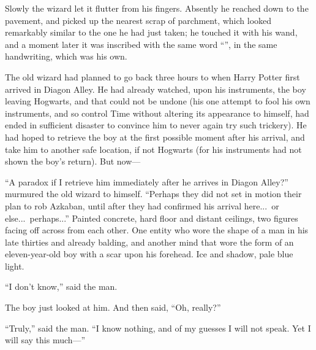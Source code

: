 Slowly the wizard let it flutter from his fingers. Absently he reached down to the pavement, and picked up the nearest scrap of parchment, which looked remarkably similar to the one he had just taken; he touched it with his wand, and a moment later it was inscribed with the same word “”, in the same handwriting, which was his own.

The old wizard had planned to go back three hours to when Harry Potter first arrived in Diagon Alley. He had already watched, upon his instruments, the boy leaving Hogwarts, and that could not be undone (his one attempt to fool his own instruments, and so control Time without altering its appearance to himself, had ended in sufficient disaster to convince him to never again try such trickery). He had hoped to retrieve the boy at the first possible moment after his arrival, and take him to another safe location, if not Hogwarts (for his instruments had not shown the boy’s return). But now—

“A paradox if I retrieve him immediately after he arrives in Diagon Alley?” murmured the old wizard to himself. “Perhaps they did not set in motion their plan to rob Azkaban, until after they had confirmed his arrival here...\ or else...\ perhaps...”
\sbreak
Painted concrete, hard floor and distant ceilings, two figures facing off across from each other. One entity who wore the shape of a man in his late thirties and already balding, and another mind that wore the form of an eleven-year-old boy with a scar upon his forehead. Ice and shadow, pale blue light.

“I don’t know,” said the man.

The boy just looked at him. And then said, “Oh, really?”

“Truly,” said the man. “I know nothing, and of my guesses I will not speak. Yet I will say this much—”
